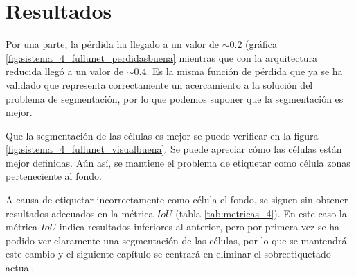 \section{Resultados}\label{sec:full_unet_resultados}




Por una parte, la pérdida ha llegado a un valor de $\sim 0.2$ (gráfica \ref{fig:sistema_4_fullunet_perdidasbuena} mientras que con la arquitectura reducida  llegó a un valor de $\sim 0.4$. Es la misma función de pérdida que ya se ha validado que representa correctamente un acercamiento a la solución del problema de segmentación, por lo que podemos suponer que la segmentación es mejor.

Que la segmentación de las células es mejor se puede verificar en la figura \ref{fig:sistema_4_fullunet_visualbuena}. Se puede apreciar cómo las células están mejor definidas. Aún así, se mantiene el problema de etiquetar como célula zonas perteneciente al fondo.

A causa de etiquetar incorrectamente como célula el fondo, se siguen sin obtener resultados adecuados en la métrica $IoU$ (tabla \ref{tab:metricas_4}). En este caso la métrica $IoU$ indica resultados inferiores al anterior, pero por primera vez se ha podido ver claramente una segmentación de las células, por lo que se mantendrá este cambio y el siguiente capítulo se centrará en eliminar el sobreetiquetado actual.